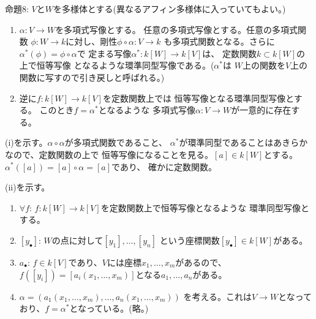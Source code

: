 \begin{framed}
  命題8:
  $V$と$W$を多様体とする(異なるアフィン多様体に入っていてもよい。)
  \begin{enumerate}[label=(\roman*)]
    \item
    $\alpha\colon V\to W$を多項式写像とする。
    任意の多項式写像とする。任意の多項式関数
    $\phi\colon W\to k$に対し、剛性$\phi\circ \alpha \colon V\to k$
    も多項式関数となる。さらに$\alpha^*(\phi) = \phi\circ \alpha$で
    定まる写像$\alpha^* \colon k[W] \to k[V]$は、
    定数関数$k\subset k[W]$の上で恒等写像
    となるような環準同型写像である。($\alpha^*$は
    $W$上の関数を$V$上の関数に写すので引き戻しと呼ばれる。)
    \item
    逆に$f\colon k[W] \to k[V]$を定数関数上では
    恒等写像となる環準同型写像とする。
    このとき$f=\alpha^*$となるような
    多項式写像$\alpha\colon V\to W$が一意的に存在する。
  \end{enumerate}
\end{framed}
\begin{myproof}
  (i)を示す。$\alpha\circ \alpha$が多項式関数であること、
  $\alpha^*$が環準同型であることはあきらかなので、定数関数の上で
  恒等写像になることを見る。$[a] \in k[W]$とする。
  $\alpha^*([a]) = [a]\circ \alpha = [a]$であり、
  確かに定数関数。

  (ii)を示す。
  \begin{enumerate}
    \item $\forall f$:
    $f\colon k[W] \to k[V]$を定数関数上で恒等写像となるような
    環準同型写像とする。
    \item $[y_\bullet]$: $W$の点に対して$[y_1],\dots,[y_n]$
    という座標関数$[y_\bullet] \in k[W]$がある。
    \item $a_\bullet$:
    $f\in k[V]$であり、$V$には座標$x_1,\dots,x_m$があるので、
    $f([y_i]) = [a_i(x_1,\dots,x_m)]$となる$a_1,\dots,a_n$がある。
    \item
    $\alpha = (a_1(x_1,\dots,x_m),\dots,a_n(x_1,\dots,x_m))$
    を考える。これは$V\to W$となっており、$f=\alpha^*$となっている。(略。)
  \end{enumerate}
\end{myproof}

